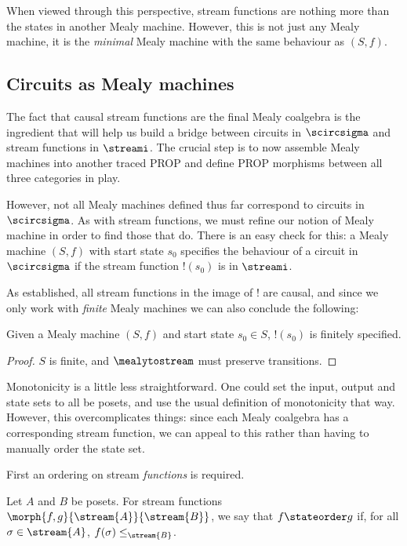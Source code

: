 When viewed through this perspective, stream functions are nothing more than the
states in another Mealy machine.
However, this is not just any Mealy machine, it is the \emph{minimal} Mealy
machine with the same behaviour as \((S, f)\).

\subsection{Circuits as Mealy machines}

The fact that causal stream functions are the final Mealy coalgebra is the
ingredient that will help us build a bridge between circuits in \(\scircsigma\)
and stream functions in \(\streami\).
The crucial step is to now assemble Mealy machines into another traced PROP
and define PROP morphisms between all three categories in play.

However, not all Mealy machines defined thus far correspond to circuits in
\(\scircsigma\).
As with stream functions, we must refine our notion of Mealy machine in
order to find those that do.
There is an easy check for this: a Mealy machine \((S, f)\) with start state
\(s_0\) specifies the behaviour of a circuit in \(\scircsigma\) if the
stream function \(!(s_0)\) is in \(\streami\).

As established, all stream functions in the image of \(!\) are causal, and since
we only work with \emph{finite} Mealy machines we can also conclude the
following:

\begin{lemma}
    Given a Mealy machine \((S, f)\) and start state \(s_0 \in S\), \(!(s_0)\)
    is finitely specified.
\end{lemma}
\begin{proof}
    \(S\) is finite, and \(\mealytostream\) must preserve transitions.
\end{proof}

Monotonicity is a little less straightforward.
One could set the input, output and state sets to all be posets, and use the
usual definition of monotonicity that way.
However, this overcomplicates things: since each Mealy coalgebra has a
corresponding stream function, we can appeal to this rather than having to
manually order the state set.

First an ordering on stream \emph{functions} is required.

\begin{definition}
    Let \(A\) and \(B\) be posets.
    For stream functions \(\morph{f,g}{\stream{A}}{\stream{B}}\), we say that
    \(f \stateorder g\) if, for all \(\sigma \in \stream{A}\),
    \(f(\sigma) \leq_{\stream{B}}\).
\end{definition}

